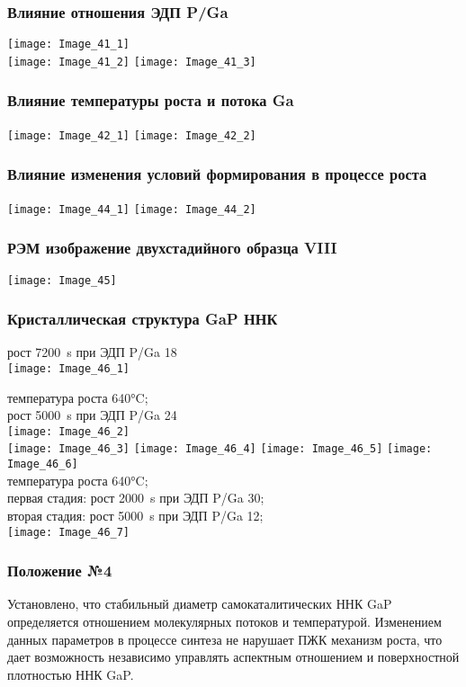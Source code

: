 \begin{frame}
	\frametitle{Влияние отношения ЭДП P/Ga}
	\centering
	\texttt{[image: Image\_41\_1]}
	\\
	\texttt{[image: Image\_41\_2]}
	\texttt{[image: Image\_41\_3]}
\end{frame}


\begin{frame}
	\frametitle{Влияние температуры роста и потока Ga}
	\centering
	\hfill
	\texttt{[image: Image\_42\_1]}
	\hfill
	\texttt{[image: Image\_42\_2]}
	\hfill
\end{frame}

\begin{frame}
	\frametitle{Влияние изменения условий формирования в процессе роста}
	\centering
	\hfill
	\texttt{[image: Image\_44\_1]}
	\hfill
	\texttt{[image: Image\_44\_2]}
	\hfill
\end{frame}

\begin{frame}
	\frametitle{РЭМ изображение двухстадийного образца VIII}
	\centering
	\texttt{[image: Image\_45]}
\end{frame}

\begin{frame}
	\frametitle{Кристаллическая структура GaP ННК}
	\centering
	рост 7200~\si{\second} при ЭДП P/Ga 18
	\\
	\texttt{[image: Image\_46\_1]}

	температура роста 640\si{\degreeCelsius};
	\\
	рост 5000~\si{\second} при ЭДП P/Ga 24
	\\
	\texttt{[image: Image\_46\_2]}
	\\
	\texttt{[image: Image\_46\_3]}
	\texttt{[image: Image\_46\_4]}
	\texttt{[image: Image\_46\_5]}
	\texttt{[image: Image\_46\_6]}
	\\
	температура роста 640\si{\degreeCelsius};
	\\
	первая стадия: рост 2000~\si{\second} при ЭДП P/Ga 30;
	\\
	вторая стадия: рост 5000~\si{\second} при ЭДП P/Ga 12;
	\\
	\texttt{[image: Image\_46\_7]}
\end{frame}

\begin{frame}
	\frametitle{Положение №4}
	\large
	Установлено, что стабильный диаметр самокаталитических ННК GaP
	определяется отношением молекулярных потоков и температурой. Изменением
	данных параметров в процессе синтеза не нарушает ПЖК механизм роста, что
	дает возможность независимо управлять аспектным отношением и поверхностной
	плотностью ННК GaP.
\end{frame}
